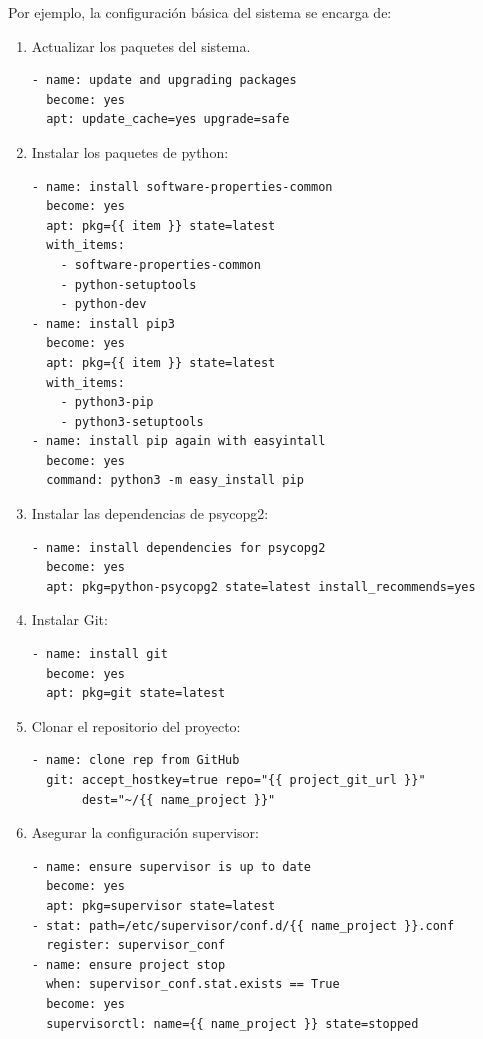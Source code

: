 Por ejemplo, la configuración básica del sistema se encarga de:
\begin{enumerate}
\item Actualizar los paquetes del sistema.
\begin{verbatim}
- name: update and upgrading packages
  become: yes
  apt: update_cache=yes upgrade=safe
\end{verbatim}

\item Instalar los paquetes de python:
\begin{verbatim}
- name: install software-properties-common
  become: yes
  apt: pkg={{ item }} state=latest
  with_items: 
    - software-properties-common
    - python-setuptools
    - python-dev
- name: install pip3
  become: yes
  apt: pkg={{ item }} state=latest
  with_items:
    - python3-pip
    - python3-setuptools
- name: install pip again with easyintall
  become: yes
  command: python3 -m easy_install pip
\end{verbatim}

\item Instalar las dependencias de psycopg2:
\begin{verbatim}
- name: install dependencies for psycopg2
  become: yes
  apt: pkg=python-psycopg2 state=latest install_recommends=yes
\end{verbatim}
  
\item Instalar Git:
\begin{verbatim}
- name: install git
  become: yes
  apt: pkg=git state=latest
\end{verbatim}

\item Clonar el repositorio del proyecto:
\begin{verbatim}
- name: clone rep from GitHub
  git: accept_hostkey=true repo="{{ project_git_url }}"
       dest="~/{{ name_project }}"
\end{verbatim}

\item Asegurar la configuración supervisor:
\begin{verbatim}
- name: ensure supervisor is up to date
  become: yes
  apt: pkg=supervisor state=latest
- stat: path=/etc/supervisor/conf.d/{{ name_project }}.conf
  register: supervisor_conf
- name: ensure project stop
  when: supervisor_conf.stat.exists == True
  become: yes
  supervisorctl: name={{ name_project }} state=stopped
\end{verbatim}
  
\end{enumerate}

